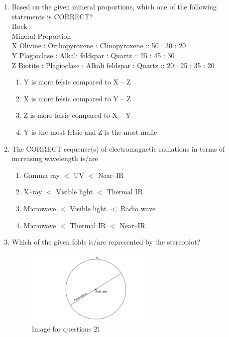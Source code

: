 \documentclass[journal,12pt,onecolumn]{IEEEtran}
\theoremstyle{remark}
\begin{document}
\begin{enumerate}
\item Based on the given mineral proportions, which one of the following statements is CORRECT?\\
Rock\\
Mineral Proportion\\
X Olivine : Orthopyroxene : Clinopyroxene :: 50 : 30 : 20\\
Y Plagioclase : Alkali feldspar : Quartz :: 25 : 45 : 30\\
Z Biotite : Plagioclase : Alkali feldspar : Quartz :: 20 : 25 : 35 : 20
\begin{enumerate}
\item Y is more felsic compared to X -- Z
\item X is more felsic compared to Y -- Z
\item Z is more felsic compared to X -- Y
\item Y is the most felsic and Z is the most mafic
\end{enumerate}

\item The CORRECT sequence(s) of electromagnetic radiations in terms of increasing wavelength is/are
\begin{enumerate}

\item Gamma ray $<$ UV $<$ Near--IR
\item X--ray $<$ Visible light $<$ Thermal IR
\item Microwave $<$ Visible light $<$ Radio wave
\item Microwave $<$ Thermal IR $<$ Near--IR
\end{enumerate}

\item Which of the given folds is/are represented by the stereoplot?

\begin{figure}[H]
    \centering
    \includegraphics[width=0.6\textwidth]{figs/fig4.png}
    \caption{Image for questions 21}
    \label{fig:question21}
\end{figure}
\vspace{0.5cm}



\end{enumerate}
\end{document}
